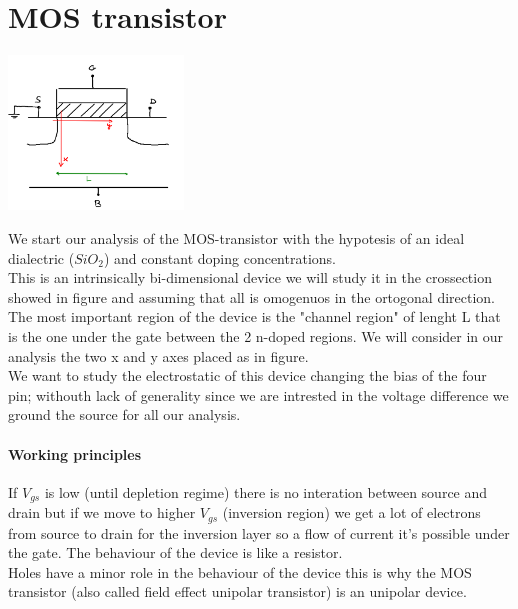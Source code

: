 \chapter{MOS transistor}
\centering
\includegraphics[width=0.35\textwidth]{mos1.png}\\
\raggedright

We start our analysis of the MOS-transistor with the hypotesis of an ideal dialectric ($SiO_2$) and constant doping concentrations.\\
This is an intrinsically bi-dimensional device we will study it in the crossection showed in figure and assuming that all is omogenuos in the ortogonal direction.\\
The most important region of the device is the "channel region" of lenght L that is the one under the gate between the 2 n-doped regions. We will consider in our analysis the two x and y axes placed as in figure.\\
We want to study the electrostatic of this device changing the bias of the four pin; withouth lack of generality since we are intrested in the voltage difference we ground the source for all our analysis.\\


\subsubsection{Working principles}
If $V_{gs}$ is low (until depletion regime) there is no interation between source and drain but if we move to higher $V_{gs}$ (inversion region) we get a lot of electrons from source to drain for the inversion layer so a flow of current it's possible under the gate. The behaviour of the device is like a resistor.\\
Holes have a minor role in the behaviour of the device this is why the MOS transistor (also called field effect unipolar transistor) is an unipolar device.\\

